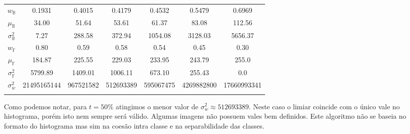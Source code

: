 \documentclass[a4paper,11pt]{article}
\begin{document}
\begin{center}
\begin{table}
\begin{tabular}[p]{@{}ccccccc@{}}
        \\
        $w_\mathbb{B}$ & 0.1931 & 0.4015 & 0.4179 & 0.4532 & 0.5479 & 0.6969 \\

        $\mu_\mathbb{B}$ & 34.00 & 51.64 & 53.61 & 61.37 & 83.08 & 112.56 \\

        $\sigma^{2}_{\mathbb{B}}$ & 7.27 & 288.58 & 372.94 & 1054.08 & 3128.03 & 5656.37 \\

        $w_{\mathbb{F}}$ & 0.80 & 0.59 & 0.58 & 0.54 & 0.45 & 0.30 \\

        $\mu_{\mathbb{F}}$ & 184.87 & 225.55 & 229.03 & 233.95 & 243.79 & 255.0 \\

        $\sigma^{2}_{\mathbb{F}}$ & 5799.89 & 1409.01 & 1006.11 & 673.10 & 255.43 & 0.0 \\

        $\sigma^{2}_{w}$ & 21495165144 & 967521582 & 512693389 & 595067475 & 4269882800 & 17660993341 \\

        \label{tab:otsu}
      \end{tabular}
    \end{table}
    \end{center}

    Como podemos notar, para $t = 50\%$ atingimos o menor valor de $\sigma^{2}_{w} \approx 512693389$. Neste caso o limiar coincide com o único vale no histograma, porém isto nem sempre será válido. Algumas imagens não possuem vales bem definidos. Este algoritmo não se baseia no formato do histograma mas sim na coesão intra classe e na separabilidade das classes.
\end{document}
